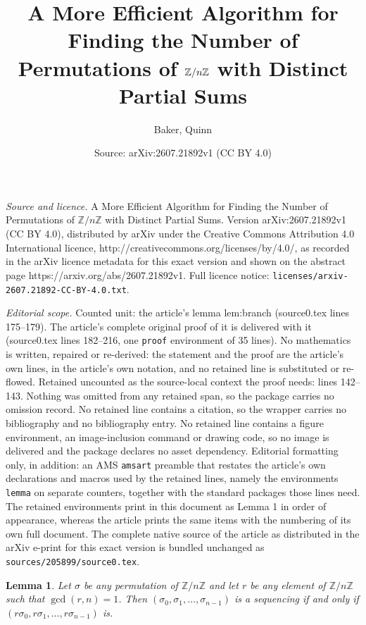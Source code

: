 \documentclass[10pt,a4paper]{amsart}
\title{A More Efficient Algorithm for Finding the Number of Permutations of $\ZZ/n\ZZ$ with Distinct Partial Sums}
\author{Baker, Quinn}
\date{Source: arXiv:2607.21892v1 (CC BY 4.0)}
\newtheorem{lemma}{Lemma}
\newcommand{\ZZ}{\mathbb{Z}}
\begin{document}
\maketitle

\noindent\emph{Source and licence.} A More Efficient Algorithm for Finding the Number of Permutations of $\ZZ/n\ZZ$ with Distinct Partial Sums. Version arXiv:2607.21892v1 (CC BY 4.0), distributed by arXiv under the Creative Commons Attribution 4.0 International licence, http://creativecommons.org/licenses/by/4.0/, as recorded in the arXiv licence metadata for this exact version and shown on the abstract page https://arxiv.org/abs/2607.21892v1. Full licence notice: \texttt{licenses/arxiv-2607.21892-CC-BY-4.0.txt}.\par\smallskip

\noindent\textit{Editorial scope.} Counted unit: the article's lemma lem:branch (source0.tex lines 175--179). The article's complete original proof of it is delivered with it (source0.tex lines 182--216, one \texttt{proof} environment of 35 lines). No mathematics is written, repaired or re-derived: the statement and the proof are the article's own lines, in the article's own notation, and no retained line is substituted or re-flowed.  Retained uncounted as the source-local context the proof needs: lines 142--143.  Nothing was omitted from any retained span, so the package carries no omission record.  No retained line contains a citation, so the wrapper carries no bibliography and no bibliography entry.  No retained line contains a figure environment, an image-inclusion command or drawing code, so no image is delivered and the package declares no asset dependency.  Editorial formatting only, in addition: an AMS \texttt{amsart} preamble that restates the article's own declarations and macros used by the retained lines, namely the environments \texttt{lemma} on separate counters, together with the standard packages those lines need.  The retained environments print in this document as Lemma 1 in order of appearance, whereas the article prints the same items with the numbering of its own full document.  The complete native source of the article as distributed in the arXiv e-print for this exact version is bundled unchanged as \texttt{sources/205899/source0.tex}.
\begin{lemma}\label{lem:rel_prime_constructive} Let $\sigma$ be any permutation of $\ZZ / n\ZZ$ and let $r$ be any element of $\ZZ / n\ZZ$ such that $\gcd(r,n)=1$. Then $(\sigma_0,\sigma_1,\ldots,\sigma_{n-1})$ is a sequencing if and only if $(r\sigma_0, r\sigma_1,\ldots,r\sigma_{n-1})$ is.
\end{lemma}
\end{document}
